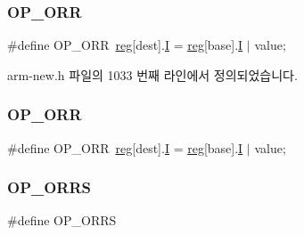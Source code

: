 \subsubsection{\texorpdfstring{O\+P\+\_\+\+O\+RR}{OP\_ORR}\hspace{0.1cm}{\footnotesize\ttfamily [1/2]}}
{\footnotesize\ttfamily \#define O\+P\+\_\+\+O\+RR~\mbox{\hyperlink{_globals_8h_ae29faba89509024ffd1a292badcedf2d}{reg}}\mbox{[}dest\mbox{]}.\mbox{\hyperlink{thumb_8h_a782b7c7c9a56a2031f6270eac7f000d6}{I}} = \mbox{\hyperlink{_globals_8h_ae29faba89509024ffd1a292badcedf2d}{reg}}\mbox{[}base\mbox{]}.\mbox{\hyperlink{thumb_8h_a782b7c7c9a56a2031f6270eac7f000d6}{I}} $\vert$ value;}



arm-\/new.\+h 파일의 1033 번째 라인에서 정의되었습니다.

\mbox{\label{_g_b_a_8cpp_adf903b1d05958a7b412adfc804bea1cd}} 
\subsubsection{\texorpdfstring{O\+P\+\_\+\+O\+RR}{OP\_ORR}\hspace{0.1cm}{\footnotesize\ttfamily [2/2]}}
{\footnotesize\ttfamily \#define O\+P\+\_\+\+O\+RR~\mbox{\hyperlink{_globals_8h_ae29faba89509024ffd1a292badcedf2d}{reg}}\mbox{[}dest\mbox{]}.\mbox{\hyperlink{thumb_8h_a782b7c7c9a56a2031f6270eac7f000d6}{I}} = \mbox{\hyperlink{_globals_8h_ae29faba89509024ffd1a292badcedf2d}{reg}}\mbox{[}base\mbox{]}.\mbox{\hyperlink{thumb_8h_a782b7c7c9a56a2031f6270eac7f000d6}{I}} $\vert$ value;}

\mbox{\label{arm-new_8h_aa6aa149e69144102013a4cb4671f9fe3}} 
\subsubsection{\texorpdfstring{O\+P\+\_\+\+O\+R\+RS}{OP\_ORRS}\hspace{0.1cm}{\footnotesize\ttfamily [1/2]}}
{\footnotesize\ttfamily \#define O\+P\+\_\+\+O\+R\+RS}

